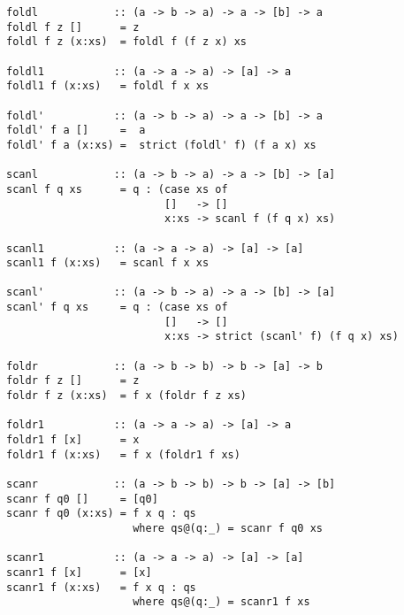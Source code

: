 \begin{verbatim}
foldl            :: (a -> b -> a) -> a -> [b] -> a
foldl f z []      = z
foldl f z (x:xs)  = foldl f (f z x) xs

foldl1           :: (a -> a -> a) -> [a] -> a
foldl1 f (x:xs)   = foldl f x xs

foldl'           :: (a -> b -> a) -> a -> [b] -> a
foldl' f a []     =  a
foldl' f a (x:xs) =  strict (foldl' f) (f a x) xs

scanl            :: (a -> b -> a) -> a -> [b] -> [a]
scanl f q xs      = q : (case xs of
                         []   -> []
                         x:xs -> scanl f (f q x) xs)

scanl1           :: (a -> a -> a) -> [a] -> [a]
scanl1 f (x:xs)   = scanl f x xs

scanl'           :: (a -> b -> a) -> a -> [b] -> [a]
scanl' f q xs     = q : (case xs of
                         []   -> []
                         x:xs -> strict (scanl' f) (f q x) xs)

foldr            :: (a -> b -> b) -> b -> [a] -> b
foldr f z []      = z
foldr f z (x:xs)  = f x (foldr f z xs)

foldr1           :: (a -> a -> a) -> [a] -> a
foldr1 f [x]      = x
foldr1 f (x:xs)   = f x (foldr1 f xs)

scanr            :: (a -> b -> b) -> b -> [a] -> [b]
scanr f q0 []     = [q0]
scanr f q0 (x:xs) = f x q : qs
                    where qs@(q:_) = scanr f q0 xs

scanr1           :: (a -> a -> a) -> [a] -> [a]
scanr1 f [x]      = [x]
scanr1 f (x:xs)   = f x q : qs
                    where qs@(q:_) = scanr1 f xs
\end{verbatim}
